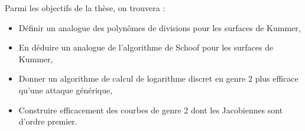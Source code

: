 \documentclass[a4paper]{article}
\theoremstyle{definition}
\theoremstyle{remark}
\numberwithin{equation}{section}
\begin{document}
Parmi les objectifs de la thèse, on trouvera :
\begin{itemize}
\item Définir un analogue des polynômes de divisions pour les surfaces de Kummer,
\item En déduire un analogue de l'algorithme de Schoof pour les surfaces de Kummer,
\item Donner un algorithme de calcul de logarithme discret en genre 2 plus efficace qu'une attaque générique,
\item Construire efficacement des courbes de genre 2 dont les Jacobiennes sont d'ordre premier.
\end{itemize}



\end{document}

